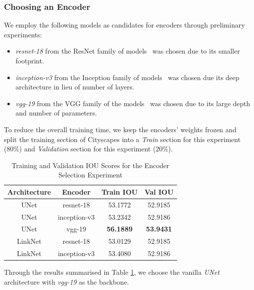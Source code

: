 \documentclass[letterpaper, 10 pt, conference]{ieeeconf}  %
\begin{document}
\subsubsection{Choosing an Encoder}
\label{encoder:preliminary}
We employ the following models as candidates for encoders through preliminary experiments:
\begin{itemize}
    \item \textit{resnet-18} from the ResNet family of models~\cite{he2016residual} was chosen due to its smaller footprint.
    \item \textit{inception-v3} from the Inception family of models~\cite{DBLP:journals/corr/SzegedyVISW15} was chosen due its deep architecture in lieu of number of layers.
    \item \textit{vgg-19} from the VGG family of the models~\cite{Simonyan15} was chosen due to its large depth and number of parameters.
\end{itemize}

To reduce the overall training time, we keep the encoders' weights frozen and split the training section of Cityscapes into a \textit{Train} section for this experiment (80\%) and \textit{Validation} section for this experiment (20\%). 

\begin{table}[!h]
\vspace{-2mm}
\caption{Training and Validation IOU Scores for the Encoder Selection Experiment}
\vspace{-4mm}
\label{encoder:metrics}
\begin{center}
\begin{tabular}{|c|c|c|c|}
\hline
\textbf{Architecture} & \textbf{Encoder} & \textbf{Train IOU} & \textbf{Val IOU}  \\
\hline
UNet & resnet-18 &  53.1772 & 52.9185 \\
\hline
UNet & inception-v3 & 53.2342 & 52.9186 \\
\hline
UNet & vgg-19 & \textbf{56.1889} & \textbf{53.9431} \\
\hline
LinkNet & resnet-18 & 53.0129 & 52.9185 \\
\hline 
LinkNet & inception-v3 & 53.4080 & 52.9186 \\
\hline
\end{tabular}
\end{center}
\vspace{-6mm}
\end{table}

Through the results summarised in Table \ref{encoder:metrics}, we choose the vanilla \textit{UNet} architecture with \textit{vgg-19} as the backbone.
\end{document}
